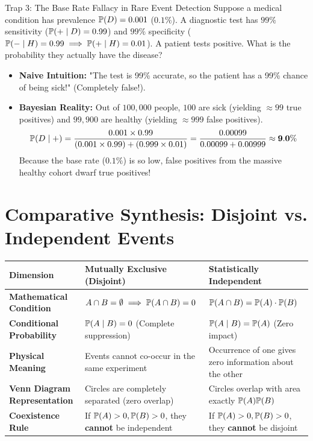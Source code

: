 \begin{trapbox}{Trap 3: The Base Rate Fallacy in Rare Event Detection}
Suppose a medical condition has prevalence $\P(D) = 0.001$ ($0.1\%$). A diagnostic test has $99\%$ sensitivity ($\P(+ \mid D) = 0.99$) and $99\%$ specificity ($\P(- \mid H) = 0.99 \implies \P(+ \mid H) = 0.01$).
A patient tests positive. What is the probability they actually have the disease?
\begin{itemize}
    \item \textbf{Naive Intuition:} "The test is 99\% accurate, so the patient has a 99\% chance of being sick!" (Completely false!).
    \item \textbf{Bayesian Reality:} Out of $100{,}000$ people, $100$ are sick (yielding $\approx 99$ true positives) and $99{,}900$ are healthy (yielding $\approx 999$ false positives).
    $$\P(D \mid +) = \frac{0.001 \times 0.99}{(0.001 \times 0.99) + (0.999 \times 0.01)} = \frac{0.00099}{0.00099 + 0.00999} \approx \mathbf{9.0\%}$$
    Because the base rate ($0.1\%$) is so low, false positives from the massive healthy cohort dwarf true positives!
\end{itemize}
\end{trapbox}

\section{Comparative Synthesis: Disjoint vs. Independent Events}

\begin{center}
\renewcommand{\arraystretch}{1.3}
\begin{tabular}{p{3.2cm}p{4.2cm}p{4.2cm}}
\toprule
\textbf{Dimension} & \textbf{Mutually Exclusive (Disjoint)} & \textbf{Statistically Independent} \\
\midrule
\textbf{Mathematical Condition} & $A \cap B = \emptyset \implies \P(A \cap B) = 0$ & $\P(A \cap B) = \P(A) \cdot \P(B)$ \\
\textbf{Conditional Probability} & $\P(A \mid B) = 0$ (Complete suppression) & $\P(A \mid B) = \P(A)$ (Zero impact) \\
\textbf{Physical Meaning} & Events cannot co-occur in the same experiment & Occurrence of one gives zero information about the other \\
\textbf{Venn Diagram Representation} & Circles are completely separated (zero overlap) & Circles overlap with area exactly $\P(A)\P(B)$ \\
\textbf{Coexistence Rule} & If $\P(A)>0, \P(B)>0$, they \textbf{cannot} be independent & If $\P(A)>0, \P(B)>0$, they \textbf{cannot} be disjoint \\
\bottomrule
\end{tabular}
\end{center}

